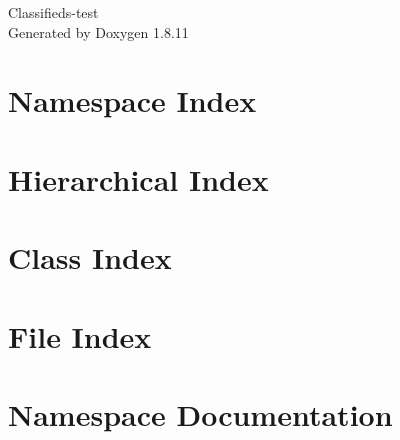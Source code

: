 \documentclass[twoside]{book}
\newcommand{\+}{\discretionary{\mbox{\scriptsize$\hookleftarrow$}}{}{}}
\newcommand{\clearemptydoublepage}{%
  \newpage{\pagestyle{empty}\cleardoublepage}%
}
\begin{document}
\hypersetup{pageanchor=false,
             bookmarksnumbered=true,
             pdfencoding=unicode
            }
\begin{titlepage}
\vspace*{7cm}
\begin{center}%
{\Large Classifieds-\/test }\\
\vspace*{1cm}
{\large Generated by Doxygen 1.8.11}\\
\end{center}
\end{titlepage}
\clearemptydoublepage
\tableofcontents
\clearemptydoublepage
{}
\hypersetup{pageanchor=true}

\chapter{Namespace Index}

\chapter{Hierarchical Index}

\chapter{Class Index}

\chapter{File Index}

\chapter{Namespace Documentation}









\end{document}
